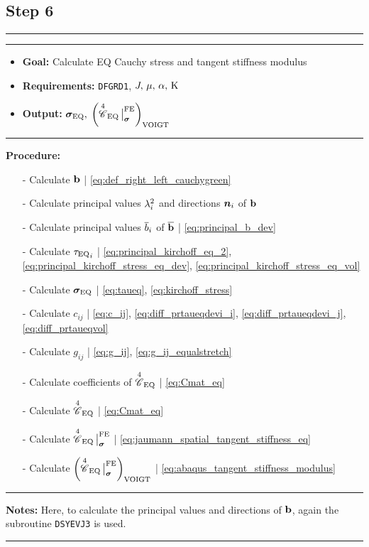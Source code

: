 \subsection*{Step 6}
\vspace{0.1cm}
\hrule
\vspace{0.1cm}
\hrule
\begin{itemize}
    \item \textbf{Goal:} Calculate EQ Cauchy stress and tangent stiffness modulus
    \item \textbf{Requirements:} \texttt{DFGRD1}, \(J,\,\mu,\, \alpha,\, \mathrm{K}\)
    \item \textbf{Output:} \({\bm{\sigma}_{\text{EQ}}},\; \left({{\overset{4}{\mathscr{C}}}_{\text{EQ}}}{\,\big|}^{\text{FE}}_{\bm{\sigma}}\right)_{\text{VOIGT}}\)
\end{itemize}
\vspace{0.1cm}
\hrule
\textbf{Procedure:}
\begin{itemize}
    \item[-] Calculate \(\mathbf{b}\) \hfill | \cref{eq:def_right_left_cauchygreen}
    \item[-] Calculate principal values \(\lambda^{2}_{{i}}\) and directions \(\bm{n}_{i}\) of \(\mathbf{b}\)
    \item[-] Calculate principal values \(\overline{b}_{{i}}\) of \(\mathbf{\overline{b}}\) \hfill | \cref{eq:principal_b_dev}
    \item[-] Calculate \({{\tau}_{\text{EQ}}}_{i}\) \hfill | \cref{eq:principal_kirchoff_eq_2}, \cref{eq:principal_kirchoff_stress_eq_dev}, \cref{eq:principal_kirchoff_stress_eq_vol}
    \item[-] Calculate \(\bm{\sigma}_{\text{EQ}}\) \hfill | \cref{eq:taueq}, \cref{eq:kirchoff_stress} 
    \item[-] Calculate \(c_{ij}\) \hfill | \cref{eq:c_ij}, \cref{eq:diff_prtaueqdevi_i}, \cref{eq:diff_prtaueqdevi_j}, \cref{eq:diff_prtaueqvol}
    \item[-] Calculate \(g_{ij}\) \hfill | \cref{eq:g_ij}, \cref{eq:g_ij_equalstretch}
    \item[-] Calculate coefficients of \({{\overset{4}{\mathscr{C}}}_{\text{EQ}}}\) \hfill | \cref{eq:Cmat_eq}
    \item[-] Calculate \({{\overset{4}{\mathscr{C}}}_{\text{EQ}}}\) \hfill | \cref{eq:Cmat_eq}
    \item[-] Calculate \({{\overset{4}{\mathscr{C}}}_{\text{EQ}}}{\,\big|}^{\text{FE}}_{\bm{\sigma}}\) \hfill | \cref{eq:jaumann_spatial_tangent_stiffness_eq}
    \item[-]  Calculate \(\left({{\overset{4}{\mathscr{C}}}_{\text{EQ}}}{\,\big|}^{\text{FE}}_{\bm{\sigma}}\right)_{\text{VOIGT}}\) \hfill | \cref{eq:abaqus_tangent_stiffness_modulus}
\end{itemize}
\vspace{0.1cm}
\hrule
\textbf{Notes:} \newline
Here, to calculate the principal values and directions of \({\mathbf{b}}\), again the subroutine \texttt{DSYEVJ3} is used.
\vspace{0.1cm}
\hrule
\vspace{0.8cm}

